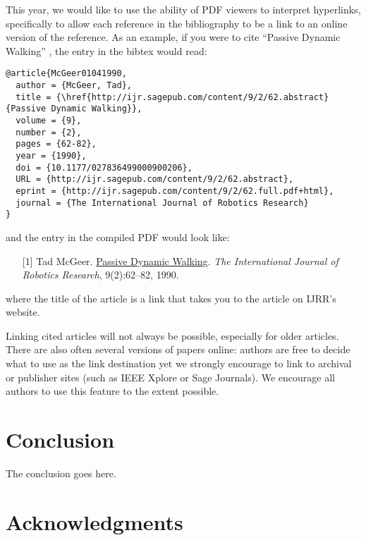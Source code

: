 \documentclass[conference]{IEEEtran}
\begin{document}
This year, we would like to use the ability of PDF viewers to interpret
hyperlinks, specifically to allow each reference in the bibliography to be a
link to an online version of the reference. 
As an example, if you were to cite ``Passive Dynamic Walking''
\cite{McGeer01041990}, the entry in the bibtex would read:

{\small
\begin{verbatim}
@article{McGeer01041990,
  author = {McGeer, Tad}, 
  title = {\href{http://ijr.sagepub.com/content/9/2/62.abstract}{Passive Dynamic Walking}}, 
  volume = {9}, 
  number = {2}, 
  pages = {62-82}, 
  year = {1990}, 
  doi = {10.1177/027836499000900206}, 
  URL = {http://ijr.sagepub.com/content/9/2/62.abstract}, 
  eprint = {http://ijr.sagepub.com/content/9/2/62.full.pdf+html}, 
  journal = {The International Journal of Robotics Research}
}
\end{verbatim}
}
\noindent
and the entry in the compiled PDF would look like:

\def\tmplabel#1{[#1]}

\begin{enumerate}
\item[\tmplabel{1}] Tad McGeer. \href{http://ijr.sagepub.com/content/9/2/62.abstract}{Passive Dynamic
Walking}. {\em The International Journal of Robotics Research}, 9(2):62--82,
1990.
\end{enumerate}
%
where the title of the article is a link that takes you to the article on IJRR's website. 


Linking cited articles will not always be possible, especially for
older articles. There are also often several versions of papers
online: authors are free to decide what to use as the link destination
yet we strongly encourage to link to archival or publisher sites
(such as IEEE Xplore or Sage Journals).  We encourage all authors to use this feature to
the extent possible.

\section{Conclusion} 
\label{sec:conclusion}

The conclusion goes here.

\section*{Acknowledgments}




\end{document}
